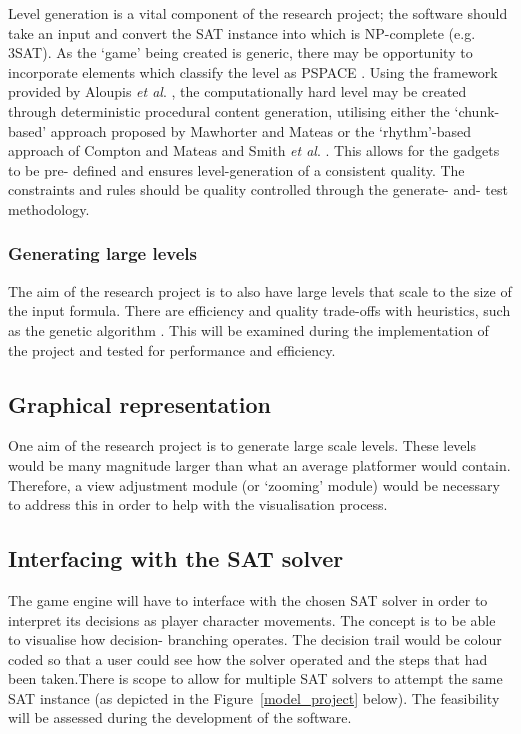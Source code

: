 \documentclass[11pt, a4paper, oneside]{report} %
\begin{document}
Level generation is a vital component of the research project; the software
should take an input and convert the SAT instance into which is NP-complete
(e.g. 3SAT). As the `game' being created is generic, there may be opportunity to
incorporate elements which classify the level as PSPACE . Using the framework
provided by Aloupis \textit{et al}. \cite{Aloupis2012}, the computationally hard
level may be created through deterministic procedural content generation,
utilising either the `chunk-based' approach proposed by Mawhorter and Mateas
\cite{mawhorter2010procedural} or the `rhythm'-based approach of Compton and
Mateas \cite{compton2006procedural} and Smith \textit{et al}.
\cite{Smith:2009:RLG:1536513.1536548}. This allows for the gadgets to be pre-
defined and ensures level-generation of a consistent quality. The constraints
and rules should be quality controlled through the generate- and- test
methodology.

\subsubsection{Generating large levels}

The aim of the research project is to also have large levels that scale to the
size of the input formula. There are efficiency and quality trade-offs with
heuristics, such as the genetic algorithm \cite{mourato2011automatic}. This will
be examined during the implementation of the project and tested for performance
and efficiency.

\subsection{Graphical representation}

One aim of the research project is to generate large scale levels. These levels
would be many magnitude larger than what an average platformer would contain.
Therefore, a view adjustment module (or `zooming' module) would be necessary to
address this in order to help with the visualisation process.


\subsection{Interfacing with the SAT solver}

The game engine will have to interface with the chosen SAT solver in order to
interpret its decisions as player character movements. The concept is to be able
to visualise how decision- branching operates. The decision trail would be
colour coded so that a user could see how the solver operated and the steps that
had been taken.There is scope to allow for multiple SAT solvers to attempt the
same SAT instance (as depicted in the Figure~\ref{model_project} below). The
feasibility will be assessed during the development of the software.
\end{document}
